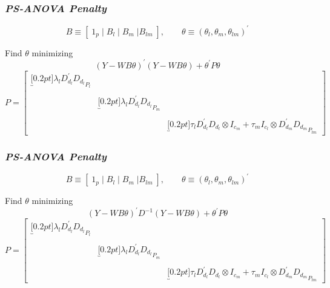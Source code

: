 \documentclass[12pt]{beamer}
\newcommand{\ms}{\scriptscriptstyle}
\begin{document}
\begin{frame}
\frametitle{\emph{PS-ANOVA Penalty}}

\[
B \equiv \left[\; 1_p \; \vert \;  B_l  \; \vert \;   B_m \; \vert B_{\ms{lm}} \; \right] ,   \qquad  \theta \equiv \left(\theta_{\ms{l}},\theta_{\ms{m}},\theta_{\ms{lm}}\right)^\prime            
\]

Find $\theta$ minimizing
\begin{equation*}
\left(Y-WB\theta\right)^\prime \left(Y-WB\theta\right) + \theta^\prime P \theta
\end{equation*}
\begin{equation*}
P  = \begin{bmatrix}
\underbracket[0.2pt]{\lambda_l D_{\ms{d_l}}^\prime D_{\ms{d_l}}}_{\text{$P_{\ms l}$}}	& 	& \\
&& \\
	&	\underbracket[0.2pt]{\lambda_l D_{\ms{d_l}}^\prime D_{\ms{d_l}}}_{\text{$P_{\ms m}$}}	& 	\\
&&\\
&&	\underbracket[0.2pt]{\tau_l D_{\ms{d_l}}^\prime D_{\ms{d_l}} \otimes I_{\ms{c_m}} + \tau_m I_{\ms{c_l}} \otimes D_{\ms{d_m}}^\prime D_{\ms{d_m}}}_{\text{$P_{\ms lm}$}}
\end{bmatrix}
\end{equation*}

\end{frame}








\begin{frame}
\frametitle{\emph{PS-ANOVA Penalty}}

\[
B \equiv \left[\; 1_p \; \vert \;  B_l  \; \vert \;   B_m \; \vert B_{\ms{lm}} \; \right] ,   \qquad  \theta \equiv \left(\theta_{\ms{l}},\theta_{\ms{m}},\theta_{\ms{lm}}\right)^\prime            
\]

Find $\theta$ minimizing
\begin{equation} \label{eq:PS-ANOVA}
\left(Y-WB\theta\right)^\prime D^{-1} \left(Y-WB\theta\right) + \theta^\prime P \theta
\end{equation}
\begin{equation*}
P  = \begin{bmatrix}
\underbracket[0.2pt]{\lambda_l D_{\ms{d_l}}^\prime D_{\ms{d_l}}}_{\text{$P_{\ms l}$}}	& 	& \\
&& \\
	&	\underbracket[0.2pt]{\lambda_l D_{\ms{d_l}}^\prime D_{\ms{d_l}}}_{\text{$P_{\ms m}$}}	& 	\\
&&\\
&&	\underbracket[0.2pt]{\tau_l D_{\ms{d_l}}^\prime D_{\ms{d_l}} \otimes I_{\ms{c_m}} + \tau_m I_{\ms{c_l}} \otimes D_{\ms{d_m}}^\prime D_{\ms{d_m}}}_{\text{$P_{\ms lm}$}}
\end{bmatrix}
\end{equation*}

\end{frame}
\end{document}
